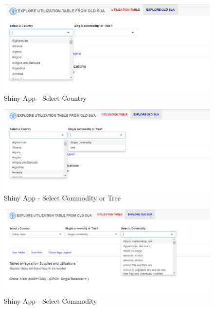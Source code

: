\documentclass[]{article}
\begin{document}
\begin{figure}[H]

{\centering \includegraphics[width=1\linewidth]{images/UtilizationTable/08_selectCountry} 

}

\caption{\label{fig:f8}Shiny App - Select Country}\label{fig:f8}
\end{figure}

\begin{figure}[H]

{\centering \includegraphics[width=1\linewidth]{images/UtilizationTable/09_selectCommodityTre} 

}

\caption{\label{fig:f9}Shiny App - Select Commodity or Tree}\label{fig:f9}
\end{figure}

\begin{figure}[H]

{\centering \includegraphics[width=1\linewidth]{images/UtilizationTable/10_selectComm} 

}

\caption{\label{fig:f10}Shiny App - Select Commodity}\label{fig:f10}
\end{figure}
\end{document}
